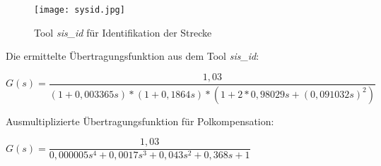 \begin{figure}[h]
	\begin{center}
		\texttt{[image: sysid.jpg]}
		\caption{Tool \textit{sis\_id} für Identifikation der Strecke}
       \label{pic_sis_id}
	\end{center} 
\end{figure}

Die ermittelte Übertragungsfunktion aus dem Tool \textit{sis\_id}: 

\begin{center}
$ G(s) = \dfrac{1,03}{(1 + 0,003365s) * (1 + 0,1864s) * (1 + 2*0,98029s + (0,091032s)^{2}) }$
\end{center}

Ausmultiplizierte Übertragungsfunktion für Polkompensation:

\begin{center}
$ G(s) =  \dfrac{1,03}{0,000005s^{4} + 0,0017s^{3	} + 0,043s^{2} + 0,368s + 1 } $
\end{center}
